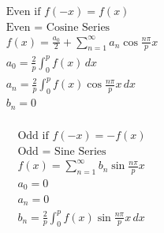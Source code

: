 \documentclass[12pt]{article}
\begin{document}
\begin{multicols}{2}

  \begin{equation*}
    \begin{split}
      \text{Even if } f(-x)=f(x)\\
      \text{Even }=\text{ Cosine Series}\\
      f(x)=\frac{a_0}{2}+\sum_{n=1}^{\infty}a_n\cos\frac{n\pi}{p}x\\
      a_0=\frac{2}{p}\int_0^pf(x)\,dx\\
      a_n=\frac{2}{p}\int_0^pf(x)\cos\frac{n\pi}{p}x\,dx\\
      b_n=0\\
    \end{split}
    \label{11}
  \end{equation*}

  \begin{equation*}
    \begin{split}
      \text{Odd if } f(-x)=-f(x)\\
      \text{Odd }=\text{ Sine Series}\\
      f(x)=\sum_{n=1}^{\infty}b_n\sin\frac{n\pi}{p}x\\
      a_0=0\\
      a_n=0\\
      b_n=\frac{2}{p}\int_0^pf(x)\sin\frac{n\pi}{p}x\,dx\\
    \end{split}
    \label{12}
  \end{equation*}


\end{multicols}
\end{document}
